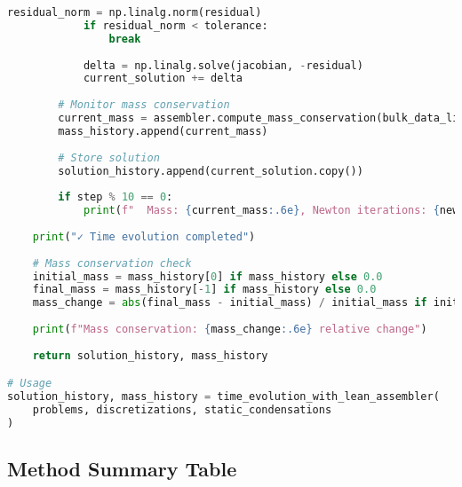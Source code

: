 \begin{lstlisting}[language=Python, caption=Time Evolution with Lean Assembler]
            residual_norm = np.linalg.norm(residual)
            if residual_norm < tolerance:
                break
            
            delta = np.linalg.solve(jacobian, -residual)
            current_solution += delta
        
        # Monitor mass conservation
        current_mass = assembler.compute_mass_conservation(bulk_data_list)
        mass_history.append(current_mass)
        
        # Store solution
        solution_history.append(current_solution.copy())
        
        if step % 10 == 0:
            print(f"  Mass: {current_mass:.6e}, Newton iterations: {newton_iter + 1}")
    
    print("✓ Time evolution completed")
    
    # Mass conservation check
    initial_mass = mass_history[0] if mass_history else 0.0
    final_mass = mass_history[-1] if mass_history else 0.0
    mass_change = abs(final_mass - initial_mass) / initial_mass if initial_mass != 0 else 0.0
    
    print(f"Mass conservation: {mass_change:.6e} relative change")
    
    return solution_history, mass_history

# Usage
solution_history, mass_history = time_evolution_with_lean_assembler(
    problems, discretizations, static_condensations
)
\end{lstlisting}

\subsection{Method Summary Table}
\label{subsec:lean_assembler_method_summary}

